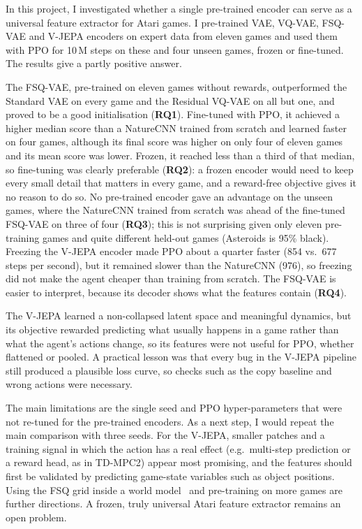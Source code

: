 \documentclass[runningheads]{llncs}
\begin{document}
In this project, I investigated whether a single pre-trained encoder can serve as a universal
feature extractor for Atari games. I pre-trained VAE, VQ-VAE, FSQ-VAE and V-JEPA encoders on
expert data from eleven games and used them with PPO for 10\,M steps on these and four unseen
games, frozen or fine-tuned. The results give a partly positive answer.

The FSQ-VAE, pre-trained on eleven games without rewards, outperformed the Standard VAE on every
game and the Residual VQ-VAE on all but one, and proved to be a good initialisation
(\textbf{RQ1}). Fine-tuned with PPO, it achieved a higher median score than a NatureCNN trained
from scratch and learned faster on four games, although its final score was higher on only
four of eleven games and its mean score was lower. Frozen, it reached less than a third of that
median, so fine-tuning was clearly preferable (\textbf{RQ2}): a frozen encoder would need to
keep every small detail that matters in every game, and a reward-free objective gives it no
reason to do so. No pre-trained encoder gave an advantage on the unseen games, where the
NatureCNN trained from scratch was ahead of the fine-tuned FSQ-VAE on three of four
(\textbf{RQ3}); this is not surprising given only eleven pre-training games and quite different
held-out games (Asteroids is 95\% black). Freezing the V-JEPA encoder made PPO about a quarter
faster (854 vs.\ 677 steps per second), but it remained slower than the NatureCNN (976), so
freezing did not make the agent cheaper than training from scratch. The FSQ-VAE is easier to
interpret, because its decoder shows what the features contain (\textbf{RQ4}).

The V-JEPA learned a non-collapsed latent space and meaningful dynamics, but its objective
rewarded predicting what usually happens in a game rather than what the agent's actions change,
so its features were not useful for PPO, whether flattened or pooled. A practical lesson was that every bug in the V-JEPA pipeline still produced a plausible loss
curve, so checks such as the copy baseline and wrong actions were necessary.

The main limitations are the single seed and PPO hyper-parameters that were not re-tuned for
the pre-trained encoders. As a next step, I would repeat the main comparison with three seeds.
For the V-JEPA, smaller patches and a training signal in which the
action has a real effect (e.g.\ multi-step prediction or a reward head, as in TD-MPC2) appear
most promising, and the features should first be validated by predicting game-state variables
such as object positions. Using the FSQ grid inside a world
model~\cite{hafner2021dreamerv2,micheli2023iris} and pre-training on more games are further
directions. A frozen, truly universal Atari feature extractor remains an open problem.
\end{document}
